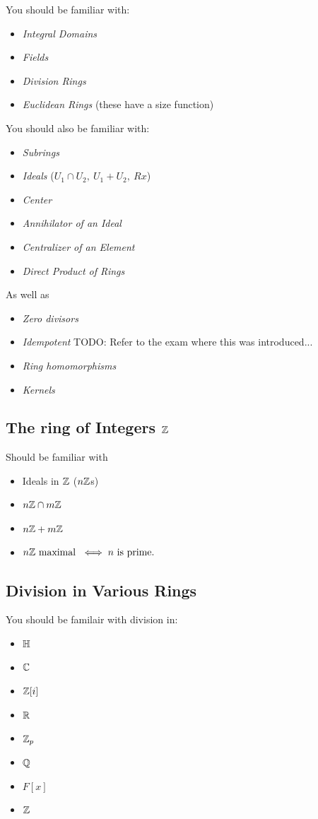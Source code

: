 You should be familiar with:
\begin{itemize}
    \item \textit{Integral Domains} 
    \item \textit{Fields}
    \item \textit{Division Rings}
    \item \textit{Euclidean Rings} (these have a size function)
\end{itemize}
You should also be familiar with:
\begin{itemize}
    \item\textit{Subrings}
    \item \textit{Ideals} ($U_1\cap U_2, \ U_1+U_2, \ Rx$)
    \item \textit{Center}
    \item \textit{Annihilator of an Ideal}
    \item \textit{Centralizer of an Element}
    \item \textit{Direct Product of Rings}
\end{itemize}
As well as
\begin{itemize}
    \item \textit{Zero divisors}
    \item \textit{Idempotent} TODO: Refer to the exam where this was introduced...
    \item \textit{Ring homomorphisms}
    \item \textit{Kernels}
\end{itemize}
\subsection*{The ring of Integers ${\mathbb{ Z}}$}
Should be familiar with 
\begin{itemize}
    \item Ideals in ${\mathbb{ Z}}$ ($n{\mathbb{ Z}}$s)
    \item $n{\mathbb{ Z}}\cap m{\mathbb{ Z}}$
    \item $n{\mathbb{ Z}}+m{\mathbb{ Z}}$
    \item $n{\mathbb{ Z}} \text{ maximal }\iff n \text{ is prime.}$
\end{itemize}
\subsection*{Division in Various Rings}
You should be familair with division in:
\begin{itemize}
    \item ${\mathbb{ H}}$
    \item ${\mathbb{ C}}$
    \item ${\mathbb{ Z}}[i]$
    \item ${\mathbb{ R}}$
    \item ${\mathbb{ Z}}_p$
    \item ${\mathbb{ Q}}$
    \item $F[x]$
    \item ${\mathbb{ Z}}$
\end{itemize}
